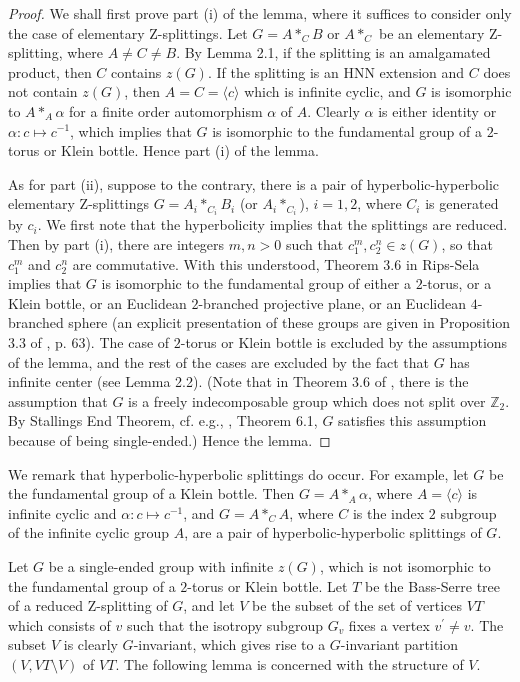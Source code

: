 \documentclass[11pt]{amsart}
\theoremstyle{plain}
\numberwithin{theorem}{section}
\theoremstyle{definition}
\begin{document}
\begin{proof}

We shall first prove part (i) of the lemma, where it suffices to consider only the case of elementary 
Z-splittings. Let $G=A\ast_C B$ or $A\ast_C$ be an elementary Z-splitting, where $A\neq C\neq B$.
By Lemma 2.1, if the splitting is an amalgamated product, then $C$ contains $z(G)$. If
the splitting is an HNN extension and $C$ does not contain $z(G)$, then $A=C=\langle c\rangle$ which
is infinite cyclic, and $G$ is isomorphic to $A\ast_A\alpha$ for a finite order automorphism
$\alpha$ of $A$. Clearly $\alpha$ is either identity or $\alpha: c\mapsto c^{-1}$, which implies that $G$
is isomorphic to the fundamental group of a $2$-torus or Klein bottle. Hence part (i) of the lemma. 

As for part (ii), suppose to the contrary, there is a pair of hyperbolic-hyperbolic elementary 
Z-splittings $G=A_i\ast_{C_i} B_i$ (or $A_i\ast_{C_i}$), $i=1,2$, where $C_i$ is generated by $c_i$. 
We first note that the hyperbolicity implies that the splittings are reduced. Then by part (i), there are 
integers $m,n>0$ such that $c_1^m, c_2^n\in z(G)$, so that $c_1^m$ and $c_2^n$
are commutative. With this understood, 
Theorem 3.6 in Rips-Sela \cite{RipS} implies that $G$ is isomorphic to the fundamental group 
of either a $2$-torus, or a Klein bottle, or an Euclidean $2$-branched projective plane, or an Euclidean
$4$-branched sphere (an explicit presentation of these groups are given in Proposition 3.3 of
\cite{RipS}, p. 63). The case of $2$-torus or Klein bottle is excluded by the assumptions of the lemma,
and the rest of the cases are excluded by the fact that $G$ has infinite center (see Lemma 2.2). 
(Note that in Theorem 3.6 of \cite{RipS}, there is the assumption that $G$ is a freely indecomposable 
group which does not split over ${{\mathbb Z}}_2$. By Stallings End Theorem, cf. e.g., \cite{SW}, Theorem 6.1,
$G$ satisfies this assumption because of being single-ended.) Hence the lemma.

\end{proof}

We remark that hyperbolic-hyperbolic splittings do occur. For example, let $G$ be the fundamental 
group of a Klein bottle. Then $G=A\ast_A\alpha$, where $A=\langle c\rangle$ is infinite cyclic and 
$\alpha: c\mapsto c^{-1}$, and $G=A\ast_C A$, where $C$ is the index $2$ subgroup of the infinite
cyclic group $A$, are a pair of hyperbolic-hyperbolic splittings of $G$. 

Let $G$ be a single-ended group with infinite $z(G)$, which is not isomorphic to the fundamental
group of a $2$-torus or Klein bottle. Let $T$ be the Bass-Serre tree of a reduced Z-splitting of $G$,
and let $V$ be the subset of the set of vertices $VT$ which consists of $v$ such that the isotropy 
subgroup $G_v$ fixes a vertex $v^\prime\neq v$. The subset $V$ is clearly $G$-invariant, which
gives rise to a $G$-invariant partition $(V, VT\setminus V)$ of $VT$. The following lemma is concerned with the structure of $V$.
\end{document}
